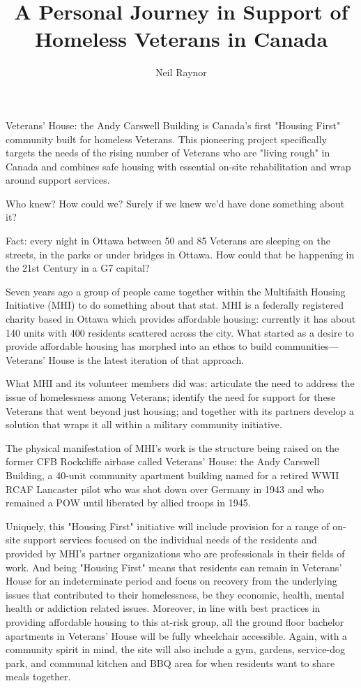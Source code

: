 %


\title{A Personal Journey in Support of Homeless Veterans in Canada}
\author{Neil Raynor}

\maketitle

Veterans' House: the Andy Carswell Building is Canada's first "Housing
First" community built for homeless Veterans. This pioneering project
specifically targets the needs of the rising number of Veterans who are
"living rough" in Canada and combines safe housing with essential
on-site rehabilitation and wrap around support services.


Who knew? How could we? Surely if we knew we'd have done something
about it?

Fact: every night in Ottawa between 50 and 85 Veterans are sleeping on
the streets, in the parks or under bridges in Ottawa. How could that be
happening in the 21st Century in a G7 capital?

Seven years ago a group of people came together within the Multifaith
Housing Initiative (MHI) to do something about that stat. MHI is a
federally registered charity based in Ottawa which provides affordable
housing: currently it has about 140 units with 400 residents scattered
across the city. What started as a desire to provide affordable housing
has morphed into an ethos to build communities---Veterans' House is the
latest iteration of that approach.

What MHI and its volunteer members did was: articulate the need to
address the issue of homelessness among Veterans; identify the need for
support for these Veterans that went beyond just housing; and together
with its partners develop a solution that wraps it all within a
military community initiative.

The physical manifestation of MHI's work is the structure being raised
on the former CFB Rockcliffe airbase called Veterans' House: the Andy
Carswell Building, a 40-unit community apartment building named for a
retired WWII RCAF Lancaster pilot who was shot down over Germany in
1943 and who remained a POW until liberated by allied troops in 1945.

Uniquely, this "Housing First" initiative will include provision for a
range of on-site support services focused on the individual needs of
the residents and provided by MHI's partner organizations who are
professionals in their fields of work. And being "Housing First" means
that residents can remain in Veterans' House for an indeterminate
period and focus on recovery from the underlying issues that
contributed to their homelessness, be they economic, health, mental
health or addiction related issues. Moreover, in line with best
practices in providing affordable housing to this at-risk group, all
the ground floor bachelor apartments in Veterans' House will be fully
wheelchair accessible. Again, with a community spirit in mind, the site
will also include a gym, gardens, service-dog park, and communal
kitchen and BBQ area for when residents want to share meals together.

